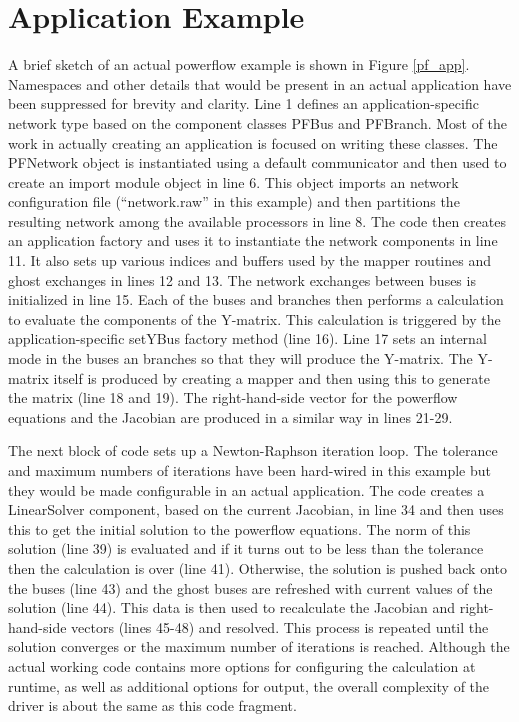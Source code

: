 \documentclass[preprint]{acm_proc_article-sp}
\begin{document}
\section{Application Example}
A brief sketch of an actual powerflow example is shown in Figure \ref{pf_app}.
Namespaces and other details that would be present in an actual application
have been suppressed for brevity and clarity. Line 1 defines an
application-specific network type based on the component classes PFBus and
PFBranch. Most of the work in actually creating an application is focused on
writing these classes. The PFNetwork object is instantiated using a default
communicator and then used to create an import module object in line 6. This
object imports an network configuration file (``network.raw'' in this example)
and then partitions the resulting network among the available processors in
line 8. The code then creates an application factory and uses it to instantiate
the network components in line 11. It also sets up various indices and buffers
used by the mapper routines and ghost exchanges in lines 12 and 13. The network
exchanges between buses is initialized in line 15. Each of the buses and
branches then performs a calculation to evaluate the components of the Y-matrix.
This calculation is triggered by the application-specific setYBus factory
method (line 16). Line 17 sets an internal mode in the buses an branches so that
they will produce the Y-matrix. The Y-matrix itself is produced by creating a
mapper and then using this to generate the matrix (line 18 and 19). The
right-hand-side vector for the powerflow equations and the Jacobian are produced
in a similar way in lines 21-29.

The next block of code sets up a Newton-Raphson iteration loop. The tolerance
and maximum numbers of iterations have been hard-wired in this example but they
would be made configurable in an actual application. The code creates a
LinearSolver component, based on the current Jacobian, in line 34 and then uses
this to get the initial solution to the powerflow equations. The norm of this
solution (line 39) is evaluated and if it turns out to be less than the
tolerance then the calculation is over (line 41). Otherwise, the solution is
pushed back onto the buses (line 43) and the ghost buses are refreshed with
current values of the solution (line 44). This data is then used to recalculate the
Jacobian and right-hand-side vectors (lines 45-48) and resolved. This process is
repeated until the solution converges or the maximum number of iterations is
reached. Although the actual working code contains more options for configuring
the calculation at runtime, as well as additional options for output, the
overall complexity of the driver is about the same as this code fragment.
\end{document}
